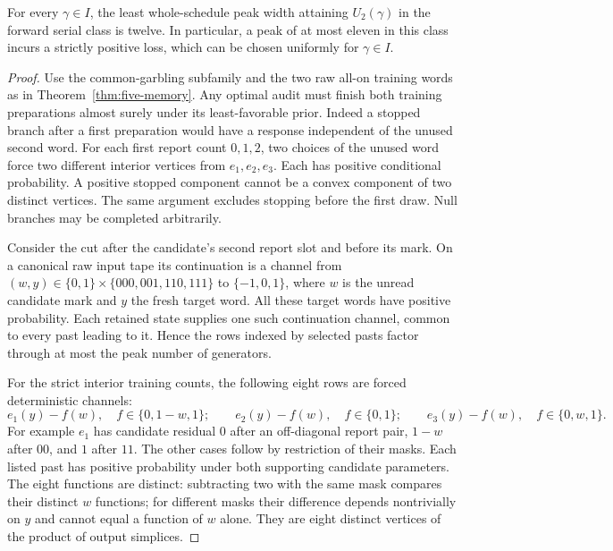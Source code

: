 \begin{theorem}
\label{thm:serial-twelve}
For every $\gamma\in I$, the least whole-schedule peak width attaining
$U_2(\gamma)$ in the forward serial class is twelve. In particular, a
peak of at most eleven in this class incurs a strictly positive loss,
which can be chosen uniformly for $\gamma\in I$.
\end{theorem}
\begin{proof}
Use the common-garbling subfamily and the two raw all-on training words
as in Theorem~\ref{thm:five-memory}. Any optimal audit must finish both
training preparations almost surely under its least-favorable prior.
Indeed a stopped branch after a first preparation would have a response
independent of the unused second word. For each first report count
$0,1,2$, two choices of the unused word force two different interior
vertices from $e_1,e_2,e_3$. Each has positive conditional probability.
A positive stopped component cannot be a convex component of two distinct
vertices. The same argument excludes stopping before the first draw.
Null branches may be completed arbitrarily.

Consider the cut after the candidate's second report slot and before
its mark. On a canonical raw input tape its continuation is a channel
from $(w,y)\in\{0,1\}\times\{000,001,110,111\}$ to
$\{-1,0,1\}$, where $w$ is the unread candidate mark and $y$ the fresh
target word. All these target words have positive probability. Each
retained state supplies one such continuation channel, common to every
past leading to it. Hence the rows indexed by selected pasts factor
through at most the peak number of generators.

For the strict interior training counts, the following eight rows are
forced deterministic channels:
\begin{equation}\label{eq:eight-residuals}
 e_1(y)-f(w),\quad f\in\{0,1-w,1\};\qquad
 e_2(y)-f(w),\quad f\in\{0,1\};\qquad
 e_3(y)-f(w),\quad f\in\{0,w,1\}.
\end{equation}
For example $e_1$ has candidate residual $0$ after an off-diagonal
report pair, $1-w$ after $00$, and $1$ after $11$.
The other cases follow by restriction of their masks. Each listed past
has positive probability under both supporting candidate parameters.
The eight functions are distinct: subtracting two with the same mask
compares their distinct $w$ functions; for different masks their
difference depends nontrivially on $y$ and cannot equal a function of
$w$ alone. They are eight distinct vertices of the product of output
simplices.


\end{proof}
